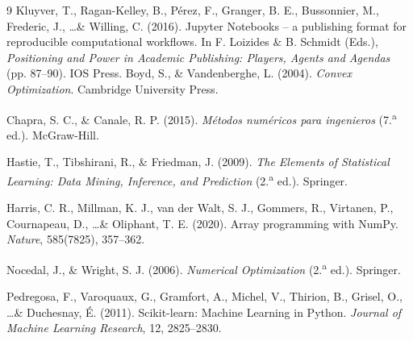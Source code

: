 \begin{thebibliography}{9}
Kluyver, T., Ragan-Kelley, B., Pérez, F., Granger, B. E., Bussonnier, M., Frederic, J., \dots \& Willing, C. (2016). 
Jupyter Notebooks -- a publishing format for reproducible computational workflows. 
In F. Loizides \& B. Schmidt (Eds.), \textit{Positioning and Power in Academic Publishing: Players, Agents and Agendas} (pp. 87--90). IOS Press.
Boyd, S., \& Vandenberghe, L. (2004). 
\textit{Convex Optimization}. 
Cambridge University Press.

Chapra, S. C., \& Canale, R. P. (2015). 
\textit{Métodos numéricos para ingenieros} (7.\textsuperscript{a} ed.). 
McGraw-Hill.

Hastie, T., Tibshirani, R., \& Friedman, J. (2009). 
\textit{The Elements of Statistical Learning: Data Mining, Inference, and Prediction} (2.\textsuperscript{a} ed.). 
Springer.

Harris, C. R., Millman, K. J., van der Walt, S. J., Gommers, R., Virtanen, P., Cournapeau, D., \dots \& Oliphant, T. E. (2020). 
Array programming with NumPy. 
\textit{Nature}, 585(7825), 357--362.

Nocedal, J., \& Wright, S. J. (2006). 
\textit{Numerical Optimization} (2.\textsuperscript{a} ed.). 
Springer.

Pedregosa, F., Varoquaux, G., Gramfort, A., Michel, V., Thirion, B., Grisel, O., \dots \& Duchesnay, É. (2011). 
Scikit-learn: Machine Learning in Python. 
\textit{Journal of Machine Learning Research}, 12, 2825--2830.

\end{thebibliography}
